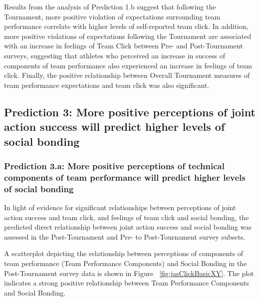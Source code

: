 \begin{CJK}{UTF8}{gbsn}

   

   


   Results from the analysis of Prediction 1.b suggest that following the Tournament, more positive violation of expectations surrounding team performance correlate with higher levels of self-reported team click.  In addition, more positive violations of expectations following the Tournament are associated with an increase in feelings of Team Click between Pre- and Post-Tournament surveys, suggesting that athletes who perceived an increase in success of components of team performance also experienced an increase in feelings of team click.  Finally, the positive relationship between Overall Tournament measures of team performance expectations and team click was also significant.






\subsection{Prediction 3: More positive perceptions of joint action success will predict higher levels of social bonding}



\subsubsection{Prediction 3.a: More positive perceptions of technical components of team performance will predict higher levels of social bonding }
In light of evidence for significant relationships between perceptions of joint action success and team click, and feelings of team click and social bonding, the predicted direct relationship between joint action success and social bonding was assessed in the Post-Tournament and Pre- to Post-Tournament survey subsets.

A scatterplot depicting the relationship between perceptions of components of team performance (Team Performance Components) and Social Bonding in the Post-Tournament survey data is shown in Figure ~\ref{fig:jasClickBasicXY}. The plot indicates a strong positive relationship between Team Performance Components and Social Bonding.


\end{CJK}
